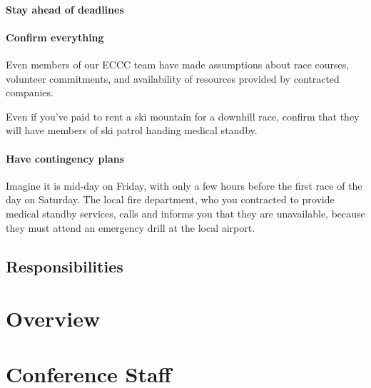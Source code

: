 \documentclass[
  letterpaper, %
  fontsize=10pt, %
  twoside=true,
  chapterentrydots=true, %
  numbers=noenddot,
  fontmethod=tex,
]{kaobook}
\begin{document}
\subsubsection{Stay ahead of deadlines}

\subsubsection{Confirm everything}

Even members of our ECCC team have made assumptions about
race courses, volunteer commitments, and availability of resources provided by contracted companies.

Even if you've paid to rent a ski mountain for a downhill race,
confirm that they will have members of ski patrol handing medical standby.

\subsubsection{Have contingency plans}

Imagine it is mid-day on Friday, with only a few hours before the first race of the day on Saturday.
The local fire department, who you contracted to provide medical standby services,
calls and informs you that they are unavailable, because they must attend an emergency drill at the local airport.

\section{Responsibilities}


\setchapterpreamble[u]{\margintoc}
\chapter{Overview}


\setchapterpreamble[u]{\margintoc}
\chapter{Conference Staff}

\appendix

\end{document}
